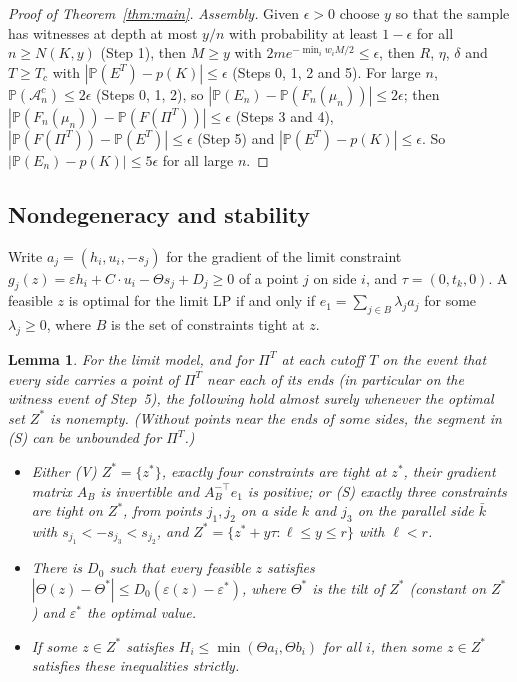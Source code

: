 \documentclass[11pt]{amsart}
\newtheorem{lemma}[theorem]{Lemma}
\theoremstyle{remark}\newtheorem{remark}[theorem]{Remark}
\newcommand{\Prob}{\mathbb{P}}
\begin{document}
\begin{proof}[Proof of Theorem~\ref{thm:main}]
\emph{Assembly.} Given $\epsilon>0$ choose $y$ so that the sample has witnesses at depth at most $y/n$ with
probability at least $1-\epsilon$ for all $n\ge N(K,y)$ (Step 1), then $M\ge y$ with $2me^{-\min_iw_iM/2}\le\epsilon$, then $R$,
$\eta$, $\delta$ and $T\ge T_c$ with $|\Prob(E^T)-p(K)|\le\epsilon$ (Steps 0, 1, 2 and 5). For large $n$,
$\Prob(\mathcal A_n^c)\le2\epsilon$ (Steps 0, 1, 2), so $|\Prob(E_n)-\Prob(F_n(\mu_n))|\le2\epsilon$; then
$|\Prob(F_n(\mu_n))-\Prob(F(\Pi^T))|\le\epsilon$ (Steps 3 and 4), $|\Prob(F(\Pi^T))-\Prob(E^T)|\le\epsilon$ (Step 5) and
$|\Prob(E^T)-p(K)|\le\epsilon$. So $|\Prob(E_n)-p(K)|\le5\epsilon$ for all large $n$.
\end{proof}

\subsection*{Nondegeneracy and stability}
Write $a_j=(h_i,u_i,-s_j)$ for the gradient of the limit constraint $g_j(z)=\varepsilon h_i+C\cdot u_i-\Theta s_j+D_j\ge0$
of a point $j$ on side $i$, and $\tau=(0,t_k,0)$. A feasible $z$ is optimal for the limit LP if and only if
$e_1=\sum_{j\in B}\lambda_ja_j$ for some $\lambda_j\ge0$, where $B$ is the set of constraints tight at $z$.

\begin{lemma}\label{lem:nondeg}
For the limit model, and for $\Pi^T$ at each cutoff $T$ on the event that every side carries a point of $\Pi^T$ near
each of its ends (in particular on the witness event of Step~5), the following hold almost surely whenever the
optimal set $Z^*$ is nonempty. (Without points near the ends of some sides, the segment in (S) can be unbounded
for $\Pi^T$.)
\begin{itemize}
\item[(a)] Either (V) $Z^*=\{z^*\}$, exactly four constraints are tight at $z^*$, their gradient matrix $A_B$ is
invertible and $A_B^{-\top}e_1$ is positive; or (S) exactly three constraints are tight on $Z^*$, from points
$j_1,j_2$ on a side $k$ and $j_3$ on the parallel side $\bar k$ with $s_{j_1}<-s_{j_3}<s_{j_2}$, and
$Z^*=\{z^*+y\tau:\ell\le y\le r\}$ with $\ell<r$.
\item[(b)] There is $D_0$ such that every feasible $z$ satisfies $|\Theta(z)-\Theta^*|\le D_0(\varepsilon(z)-\varepsilon^*)$,
where $\Theta^*$ is the tilt of $Z^*$ (constant on $Z^*$) and $\varepsilon^*$ the optimal value.
\item[(c)] If some $z\in Z^*$ satisfies $H_i\le\min(\Theta a_i,\Theta b_i)$ for all $i$, then some $z\in Z^*$
satisfies these inequalities strictly.
\end{itemize}
\end{lemma}
\end{document}
